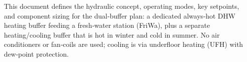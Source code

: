 \markdownRendererDocumentBegin
\markdownRendererSectionBegin
{}\markdownRendererInterblockSeparator
{}This document defines the hydraulic concept, operating modes, key setpoints, and component sizing for the dual‑buffer plan: a dedicated always‑hot DHW heating buffer feeding a fresh‑water station (FriWa), plus a separate heating/cooling buffer that is hot in winter and cold in summer. No air conditioners or fan‑coils are used; cooling is via underfloor heating (UFH) with dew‑point protection.\markdownRendererInterblockSeparator
{}\markdownRendererSectionBegin
{}
\markdownRendererSectionEnd 
\markdownRendererSectionEnd \markdownRendererDocumentEnd